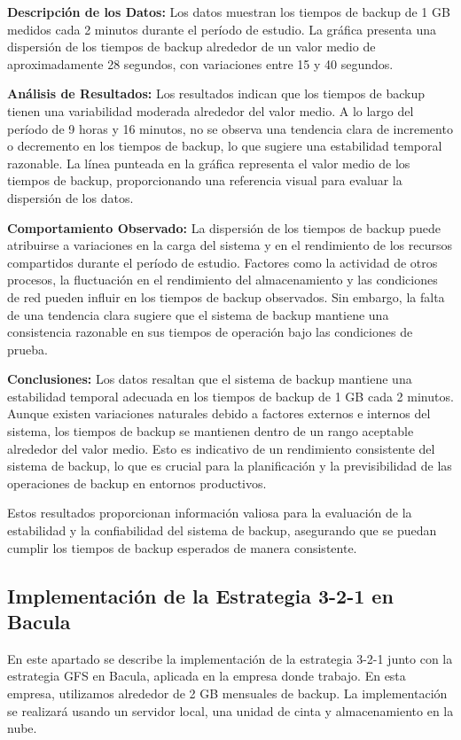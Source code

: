 \textbf{Descripción de los Datos:}
Los datos muestran los tiempos de backup de 1 GB medidos cada 2 minutos durante el período de estudio. La gráfica presenta una dispersión de los tiempos de backup alrededor de un valor medio de aproximadamente 28 segundos, con variaciones entre 15 y 40 segundos.

\textbf{Análisis de Resultados:}
Los resultados indican que los tiempos de backup tienen una variabilidad moderada alrededor del valor medio. A lo largo del período de 9 horas y 16 minutos, no se observa una tendencia clara de incremento o decremento en los tiempos de backup, lo que sugiere una estabilidad temporal razonable. La línea punteada en la gráfica representa el valor medio de los tiempos de backup, proporcionando una referencia visual para evaluar la dispersión de los datos.

\textbf{Comportamiento Observado:}
La dispersión de los tiempos de backup puede atribuirse a variaciones en la carga del sistema y en el rendimiento de los recursos compartidos durante el período de estudio. Factores como la actividad de otros procesos, la fluctuación en el rendimiento del almacenamiento y las condiciones de red pueden influir en los tiempos de backup observados. Sin embargo, la falta de una tendencia clara sugiere que el sistema de backup mantiene una consistencia razonable en sus tiempos de operación bajo las condiciones de prueba.

\textbf{Conclusiones:}
Los datos resaltan que el sistema de backup mantiene una estabilidad temporal adecuada en los tiempos de backup de 1 GB cada 2 minutos. Aunque existen variaciones naturales debido a factores externos e internos del sistema, los tiempos de backup se mantienen dentro de un rango aceptable alrededor del valor medio. Esto es indicativo de un rendimiento consistente del sistema de backup, lo que es crucial para la planificación y la previsibilidad de las operaciones de backup en entornos productivos.

Estos resultados proporcionan información valiosa para la evaluación de la estabilidad y la confiabilidad del sistema de backup, asegurando que se puedan cumplir los tiempos de backup esperados de manera consistente.


\subsection{Implementación de la Estrategia 3-2-1 en Bacula}

En este apartado se describe la implementación de la estrategia 3-2-1 junto con la estrategia GFS en Bacula, aplicada en la empresa donde trabajo. En esta empresa, utilizamos alrededor de 2 GB mensuales de backup. La implementación se realizará usando un servidor local, una unidad de cinta y almacenamiento en la nube.

